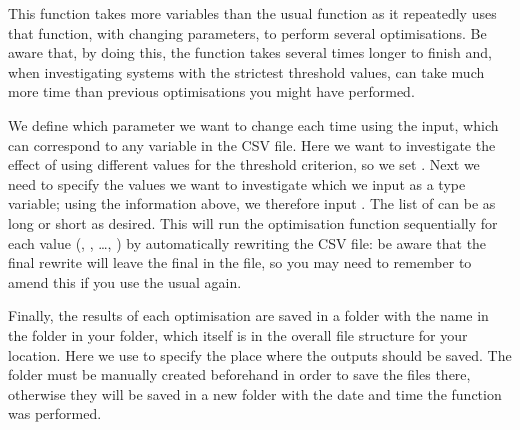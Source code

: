 \documentclass[letterpaper,10pt,english]{sphinxmanual}
\begin{document}
\sphinxAtStartPar
This function takes more variables than the usual
 function as it
repeatedly uses that function, with changing parameters, to perform
several optimisations. Be aware that, by doing this, the
 function takes
several times longer to finish and, when investigating systems with the
strictest threshold values, can take much more time than previous
optimisations you might have performed.

\sphinxAtStartPar
We define which parameter we want to change each time using the
 input, which can correspond to any variable in the
 CSV file. Here we want to investigate the effect
of using different values for the threshold criterion, so we set
. Next we need to specify the values we
want to investigate which we input as a \sphinxhyphen{}type variable; using
the information above, we therefore input
. The list of
 can be as long or short as desired. This will run
the optimisation function sequentially for each value
(, , …,
) by automatically rewriting the
 CSV file: be aware that the final rewrite will
leave the final  in the file, so you may need to
remember to amend this if you use the usual
 again.

\sphinxAtStartPar
Finally, the results of each optimisation are saved in a folder with the
name  in the  folder in your
 folder, which itself is in the overall file structure for
your location. Here we use
 to specify the
place where the outputs should be saved. The folder must be manually
created beforehand in order to save the files there, otherwise they will
be saved in a new folder with the date and time the function was
performed.
\end{document}
